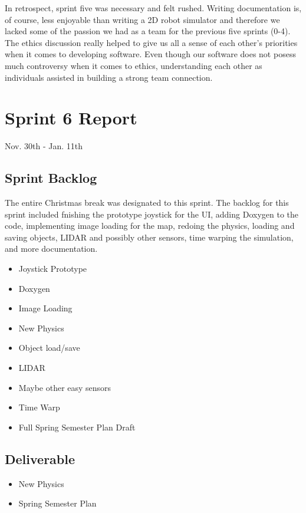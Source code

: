 In retrospect, sprint five was necessary and felt rushed. Writing documentation is, of course, less enjoyable than writing a 2D robot simulator and therefore we lacked some of the passion we had as a team for the previous five sprints (0-4). The ethics discussion really helped to give us all a sense of each other's priorities when it comes to developing software. Even though our software does not posess much controversy when it comes to ethics, understanding each other as individuals assisted in building a strong team connection.


\section{Sprint 6 Report}
Nov. 30th - Jan. 11th
\subsection{Sprint Backlog}

The entire Christmas break was designated to this sprint. The backlog for this sprint included fnishing the prototype joystick for the UI, adding Doxygen to the code, implementing image loading for the map, redoing the physics, loading and saving objects, LIDAR and possibly other sensors, time warping the simulation, and more documentation.

\begin{itemize}
	\item Joystick Prototype
	\item Doxygen	
	\item Image Loading
	\item New Physics
	\item Object load/save
	\item LIDAR
	\item Maybe other easy sensors
	\item Time Warp
	\item Full Spring Semester Plan Draft
\end{itemize}

\subsection{Deliverable}

\begin{itemize}
	\item New Physics
	\item Spring Semester Plan
\end{itemize}

